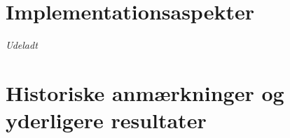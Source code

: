 \section{Implementationsaspekter}

\emph{Udeladt}
%
%
%

\section{Historiske anmærkninger og yderligere resultater}

